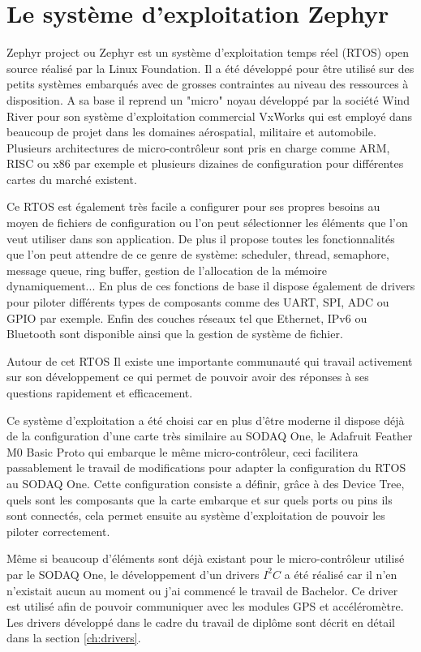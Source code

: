 \section{Le système d'exploitation Zephyr}

Zephyr project ou Zephyr est un système d'exploitation temps réel (RTOS) open source réalisé par la Linux Foundation. Il a été développé pour être utilisé sur des petits systèmes embarqués avec de grosses contraintes au niveau des ressources à disposition. A sa base il reprend un "micro" noyau développé par la société Wind River pour son système d'exploitation commercial VxWorks qui est employé dans beaucoup de projet dans les domaines aérospatial, militaire et automobile.
Plusieurs architectures de micro-contrôleur sont pris en charge comme ARM, RISC ou x86 par exemple et plusieurs dizaines de configuration pour différentes cartes du marché existent. 

Ce RTOS est également très facile a configurer pour ses propres besoins au moyen de fichiers de configuration ou l'on peut sélectionner les éléments que l'on veut utiliser dans son application. De plus il propose toutes les fonctionnalités que l'on peut attendre de ce genre de système: scheduler, thread, semaphore, message queue, ring buffer, gestion de l'allocation de la mémoire dynamiquement...
En plus de ces fonctions de base il dispose également de drivers pour piloter différents types de composants comme des UART, SPI, ADC ou GPIO par exemple. Enfin des couches réseaux tel que Ethernet, IPv6 ou Bluetooth sont disponible ainsi que la gestion de système de fichier. \cite{zephyr_web}

Autour de cet RTOS Il existe une importante communauté qui travail activement sur son développement ce qui permet de pouvoir avoir des réponses à ses questions rapidement et efficacement.

Ce système d'exploitation a été choisi car en plus d'être moderne il dispose déjà de la configuration d'une carte très similaire au SODAQ One, le Adafruit Feather M0 Basic Proto qui embarque le même micro-contrôleur, ceci facilitera passablement le travail de modifications pour adapter la configuration du RTOS au SODAQ One. Cette configuration consiste a définir, grâce à des Device Tree, quels sont les composants que la carte embarque et sur quels ports ou pins ils sont connectés, cela permet ensuite au système d'exploitation de pouvoir les piloter correctement.

Même si beaucoup d'éléments sont déjà existant pour le micro-contrôleur utilisé par le SODAQ One, le développement d'un drivers $I^{2}C$ a été réalisé car il n'en n'existait aucun au moment ou j'ai commencé le travail de Bachelor. Ce driver est utilisé afin de pouvoir communiquer avec les modules GPS et accéléromètre. Les drivers développé dans le cadre du travail de diplôme sont décrit en détail dans la section \ref{ch:drivers}.

